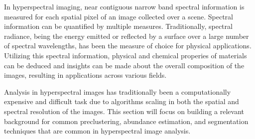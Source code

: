In hyperspectral imaging, near contiguous narrow band spectral information is measured for each spatial pixel of an image collected over a scene. Spectral information can be quantified by multiple measures. Traditionally, spectral radiance, being the energy emitted or reflected by a surface over a large number of spectral wavelengths, has been the measure of choice for physical applications. Utilizing this spectral information, physical and chemical properies of materials can be deduced and insights can be made about the overall composition of the images, resulting in applications across various fields.

Analysis in hyperspectral images has traditionally been a computationally expensive and difficult task due to algorithms scaling in both the spatial and spectral resolution of the images. This section will focus on building a relevant background for common preclustering, abundance estimation, and segmentation techniques that are common in hyperspectral image analysis.

